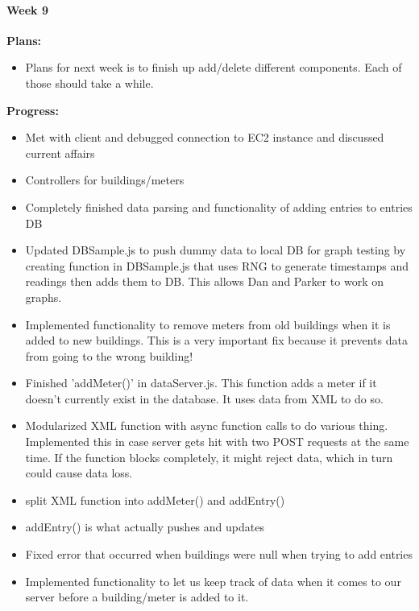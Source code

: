 \paragraph{Week 9}
\begin{adjustwidth}{2.5em}{0pt}
    \vspace{-0.5cm}\textbf{Plans:}
    \vspace{-0.5cm}
    \begin{itemize}
        \item Plans for next week is to finish up add/delete different components. Each of those should take a while. 
    \end{itemize} 
    \vspace{-0.3cm}\textbf{Progress:}
    \vspace{-0.5cm}
    \begin{itemize}
     \item Met with client and debugged connection to EC2 instance and discussed current affairs
	 \item Controllers for buildings/meters 
	 \item Completely finished data parsing and functionality of adding entries to entries DB 
	 \item Updated DBSample.js to push dummy data to local DB for graph testing by creating function in DBSample.js that uses RNG to generate timestamps and readings then adds them to DB. This allows Dan and Parker to work on graphs.
	 \item Implemented functionality to remove meters from old buildings when it is added to new buildings. This is a very important fix because it prevents data from going to the wrong building!
	 \item Finished 'addMeter()' in dataServer.js. This function adds a meter if it doesn't currently exist in the database. It uses data from XML to do so.
	 \item Modularized XML function with async function calls to do various thing. Implemented this in case server gets hit with two POST requests at the same time. If the function blocks completely, it might reject data, which in turn could cause data loss. 
	 \item split XML function into addMeter() and addEntry()
	 \item addEntry() is what actually pushes and updates 
	 \item Fixed error that occurred when buildings were null when trying to add entries 
	 \item Implemented functionality to let us keep track of data when it comes to our server before a building/meter is added to it. 

\end{itemize}
\end{adjustwidth}
